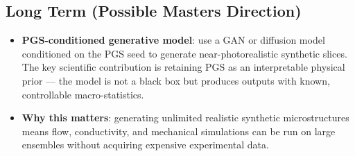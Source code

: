 \documentclass[11pt, a4paper]{article}
\begin{document}
\subsection{Long Term (Possible Masters Direction)}

\begin{itemize}
    \item \textbf{PGS-conditioned generative model}: use a GAN or diffusion model conditioned on the PGS seed to generate near-photorealistic synthetic slices. The key scientific contribution is retaining PGS as an interpretable physical prior --- the model is not a black box but produces outputs with known, controllable macro-statistics.
    \item \textbf{Why this matters}: generating unlimited realistic synthetic microstructures means flow, conductivity, and mechanical simulations can be run on large ensembles without acquiring expensive experimental data.
\end{itemize}
\end{document}
